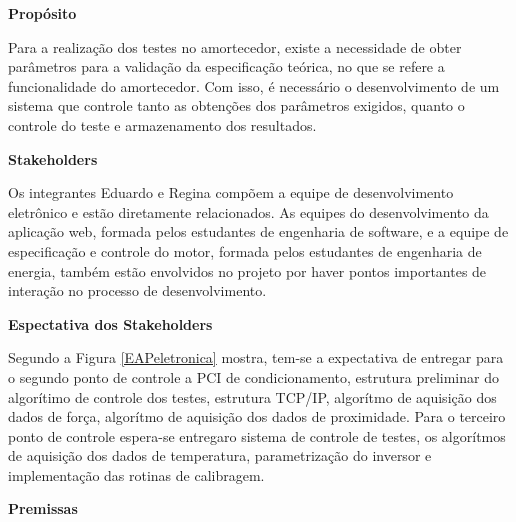 	\textbf{Propósito}

	Para a realização dos testes no amortecedor, existe a necessidade de obter parâmetros para a validação da especificação teórica, no que se refere a funcionalidade do amortecedor. Com isso, é necessário o desenvolvimento de um sistema que controle tanto as obtenções dos parâmetros exigidos, quanto o controle do teste e armazenamento dos resultados.

	\textbf{Stakeholders}

	Os integrantes Eduardo e Regina compõem a equipe de desenvolvimento eletrônico e estão diretamente relacionados. As equipes do desenvolvimento da aplicação web, formada pelos estudantes de engenharia de software, e a equipe de especificação e controle do motor, formada pelos estudantes de engenharia de energia, também estão envolvidos no projeto por haver pontos importantes de interação no processo de desenvolvimento.

	\textbf{Espectativa dos Stakeholders}

	Segundo a Figura \ref{EAPeletronica} mostra, tem-se a expectativa de entregar para o segundo ponto de controle a PCI de condicionamento, estrutura preliminar do algorítimo de controle dos testes, estrutura TCP/IP, algorítmo de aquisição dos dados de força, algorítmo de aquisição dos dados de proximidade.
	Para o terceiro ponto de controle espera-se entregaro sistema de controle de testes, os algorítmos de aquisição dos dados de temperatura, parametrização do inversor e implementação das rotinas de calibragem.

	\textbf{Premissas}

